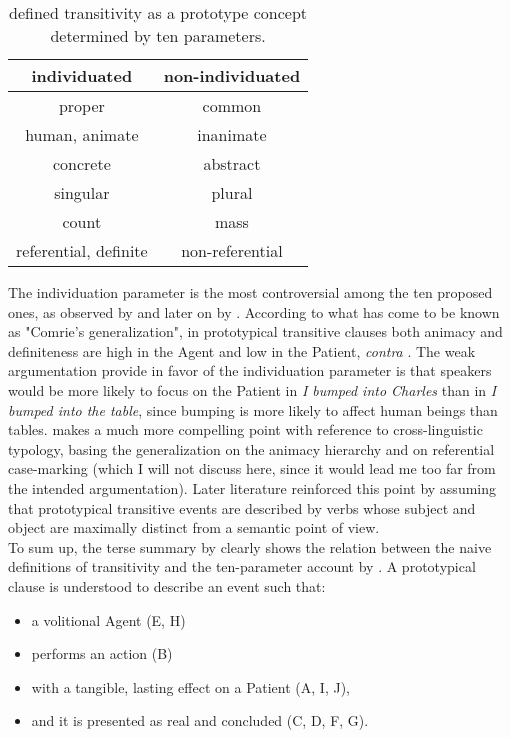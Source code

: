 \begin{table}[htb] %
\caption{\textcite[252]{HopperThompson1980} defined transitivity as a prototype concept determined by ten parameters.}
\begin{tabular}{c|c}
 \textbf{individuated} & \textbf{non-individuated} \\
 \hline
proper & common \\
human, animate & inanimate \\
concrete & abstract \\
singular & plural \\
count & mass \\
referential, definite & non-referential
\end{tabular}
\end{table}

The individuation parameter is the most controversial among the ten proposed ones, as observed by \textcite[128]{comrie1989language} and later on by \textcite[18]{Naess2007}. According to what has come to be known as "Comrie's generalization", in prototypical transitive clauses both animacy and definiteness are high in the Agent and low in the Patient, \textit{contra} \textcite{HopperThompson1980}. The weak argumentation \textcite{HopperThompson1980} provide in favor of the individuation parameter is that speakers would be more likely to focus on the Patient in \textit{I bumped into Charles} than in \textit{I bumped into the table}, since bumping is more likely to affect human beings than tables. \textcite{comrie1989language} makes a much more compelling point with reference to cross-linguistic typology, basing the generalization on the animacy hierarchy and on referential case-marking (which I will not discuss here, since it would lead me too far from the intended argumentation). Later literature \parencite{Naess2007, kemmer1993middle, Kardos2010, Naess2009} reinforced this point by assuming that prototypical transitive events are described by verbs whose subject and object are maximally distinct from a semantic point of view.\\
To sum up, the terse summary by \textcite[15]{Naess2007} clearly shows the relation between the naive definitions of transitivity and the ten-parameter account by \textcite{HopperThompson1980}. A prototypical clause is understood to describe an event such that:
\begin{itemize}
    \item a volitional Agent (E, H)
    \item performs an action (B)
    \item with a tangible, lasting effect on a Patient (A, I, J),
    \item and it is presented as real and concluded (C, D, F, G).
\end{itemize}

